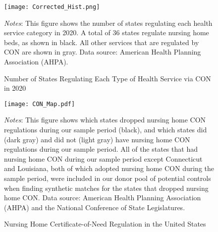 \documentclass[../Main.tex]{subfiles}
\begin{document}
\newpage
\begin{figure}[t]
	\begin{center}
	\caption{\label{fig:nh_histogram} \centering Number of States Regulating Each Type of Health Service via CON in 2020}
    \texttt{[image: Corrected\_Hist.png]}
    \end{center}
    \footnotesize
		\textit{Notes}: This figure shows the number of states regulating each health service category in 2020. A total of 36 states regulate nursing home beds, as shown in black. All other services that are regulated by CON are shown in gray. Data source: American Health Planning Association (AHPA).
\end{figure}
\clearpage

\newpage
\begin{figure}[t]
	\begin{center}
	\caption{\label{fig:nh_con_map} \centering Nursing Home Certificate-of-Need Regulation in the United States}
    \texttt{[image: CON\_Map.pdf]}
    \end{center}
    \footnotesize
		\textit{Notes}: This figure shows which states dropped nursing home CON regulations during our sample period (black), and which states did (dark gray) and did not (light gray) have nursing home CON regulations during our sample period. All of the states that had nursing home CON during our sample period except Connecticut and Louisiana, both of which adopted nursing home CON during the sample period, were included in our donor pool of potential controls when finding synthetic matches for the states that dropped nursing home CON. Data source: American Health Planning Association (AHPA) and the National Conference of State Legislatures.
\end{figure}
\clearpage
\end{document}
